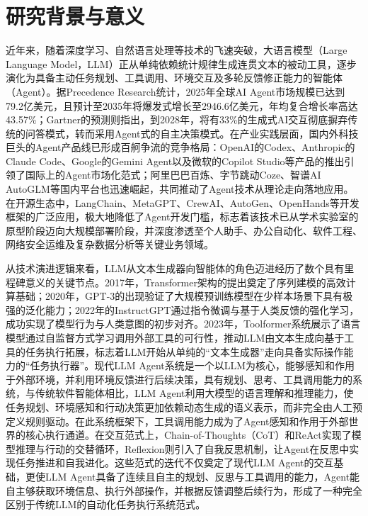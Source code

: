 \section{研究背景与意义}

近年来，随着深度学习、自然语言处理等技术的飞速突破，大语言模型（Large Language Model，LLM）正从单纯依赖统计规律生成连贯文本的被动工具，逐步演化为具备主动任务规划、工具调用、环境交互及多轮反馈修正能力的智能体（Agent）。据Precedence Research统计，2025年全球AI Agent市场规模已达到79.2亿美元，且预计至2035年将爆发式增长至2946.6亿美元，年均复合增长率高达43.57\%\cite{precedence2025aiagents}；Gartner的预测则指出，到2028年，将有33\%的生成式AI交互彻底摒弃传统的问答模式，转而采用Agent式的自主决策模式\cite{gartner2025agentic}。在产业实践层面，国内外科技巨头的Agent产品线已形成百舸争流的竞争格局：OpenAI的Codex、Anthropic的Claude Code、Google的Gemini Agent以及微软的Copilot Studio等产品的推出引领了国际上的Agent市场化范式；阿里巴巴百炼、字节跳动Coze、智谱AI AutoGLM等国内平台也迅速崛起，共同推动了Agent技术从理论走向落地应用。在开源生态中，LangChain\cite{langchain}、MetaGPT\cite{hong2024metagpt}、CrewAI、AutoGen\cite{wu2024autogen}、OpenHands等开发框架的广泛应用，极大地降低了Agent开发门槛，标志着该技术已从学术实验室的原型阶段迈向大规模部署阶段，并深度渗透至个人助手、办公自动化、软件工程、网络安全运维及复杂数据分析等关键业务领域\cite{park2023generative,wang2024survey,xi2025rise}。

从技术演进逻辑来看，LLM从文本生成器向智能体的角色迈进经历了数个具有里程碑意义的关键节点。2017年，Transformer架构\cite{vaswani2017attention}的提出奠定了序列建模的高效计算基础；2020年，GPT-3\cite{brown2020language}的出现验证了大规模预训练模型在少样本场景下具有极强的泛化能力；2022年的InstructGPT\cite{ouyang2022training}通过指令微调与基于人类反馈的强化学习，成功实现了模型行为与人类意图的初步对齐。2023年，Toolformer\cite{schick2023toolformer}系统展示了语言模型通过自监督方式学习调用外部工具的可行性，推动LLM由文本生成向基于工具的任务执行拓展，标志着LLM开始从单纯的“文本生成器”走向具备实际操作能力的“任务执行器”。现代LLM Agent系统是一个以LLM为核心，能够感知和作用于外部环境，并利用环境反馈进行后续决策，具有规划、思考、工具调用能力的系统\cite{zhang2026generalizability,yehudai2026survey}，与传统软件智能体相比，LLM Agent利用大模型的语言理解和推理能力，使任务规划、环境感知和行动决策更加依赖动态生成的语义表示，而非完全由人工预定义规则驱动\cite{wang2024survey}。在此系统框架下，工具调用能力成为了Agent感知和作用于外部世界的核心执行通道。在交互范式上，Chain-of-Thoughts\cite{wei2022chain}（CoT）和ReAct\cite{yao2023react}实现了模型推理与行动的交替循环，Reflexion\cite{shinn2023reflexion}则引入了自我反思机制，让Agent在反思中实现任务推进和自我进化。这些范式的迭代不仅奠定了现代LLM Agent的交互基础，更使LLM Agent具备了连续且自主的规划、反思与工具调用的能力，Agent能自主够获取环境信息、执行外部操作，并根据反馈调整后续行为，形成了一种完全区别于传统LLM的自动化任务执行系统范式。


